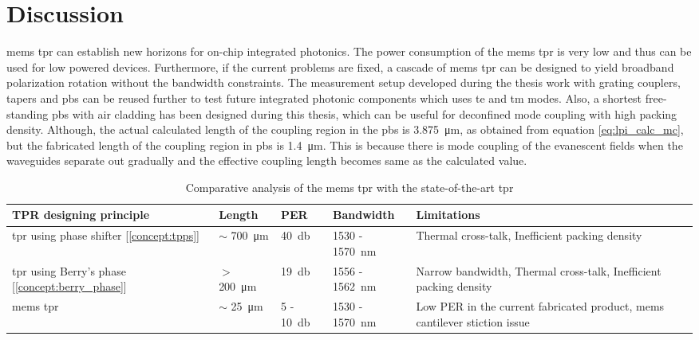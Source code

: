 \documentclass[../report.tex]{subfiles}
\begin{document}
	
	\chapter{Discussion}
\gls{mems} \gls{tpr} can establish new horizons for on-chip integrated photonics. The power consumption of the \gls{mems} \gls{tpr} is very low and thus can be used for low powered devices. Furthermore, if the current problems are fixed, a cascade of \gls{mems} \gls{tpr} can be designed to yield broadband polarization rotation without the bandwidth constraints. The measurement setup developed during the thesis work with grating couplers, tapers and \gls{pbs} can be reused further to test future integrated photonic components which uses \gls{te} and \gls{tm} modes. Also, a shortest free-standing \gls{pbs} with air cladding has been designed during this thesis, which can be useful for deconfined mode coupling with high packing density. Although, the actual calculated length of the coupling region in the \gls{pbs} is \SI{3.875}{\micro \meter}, as obtained from equation \ref{eq:lpi_calc_mc}, but the fabricated length of the coupling region in \gls{pbs} is \SI{1.4}{\micro \meter}. This is because there is mode coupling of the evanescent fields when the waveguides separate out gradually and the effective coupling length becomes same as the calculated value.   
	
\begin {table}[H]
\begin{center} 
	\begin{tabular}{ | m{8em} | m{1.7cm}| m{1.7cm} | m{2.8cm} | m{10em} | }  
		\hline
		\textbf{TPR designing principle} & \textbf{Length} & \textbf{PER} & \textbf{Bandwidth} & \textbf{Limitations} \\ [1.5ex]
		\hline\hline
		\gls{tpr} using phase shifter [\ref{concept:tpps}] & $\sim$ \SI{700}{\micro \meter} & \SI{40}{\decibel} & 1530 - \SI{1570}{\nano \meter} & Thermal cross-talk, Inefficient packing density \\ 
		\hline	
		\gls{tpr} using Berry's phase [\ref{concept:berry_phase}] & $>$ \SI{200}{\micro \meter} & \SI{19}{\decibel} & 1556 - \SI{1562}{\nano \meter}  &  Narrow bandwidth, Thermal cross-talk, Inefficient packing density \\ 
		\hline
		\gls{mems} \gls{tpr} & $\sim$ \SI{25}{\micro \meter} & 5 - \SI{10}{\decibel} & 1530 - \SI{1570}{\nano \meter} & Low PER in the current fabricated product, \gls{mems} cantilever stiction issue \\ [1ex] 
		\hline
	\end{tabular}
\end{center}
\caption {Comparative analysis of the \gls{mems} \gls{tpr} with the state-of-the-art \gls{tpr}} \label{table:tpr_comparision} 
\end {table}
\end{document}

